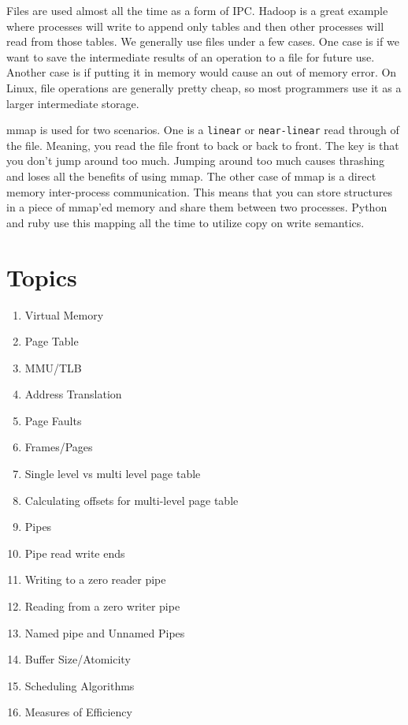 Files are used almost all the time as a form of IPC. Hadoop is a great example where processes will write to append only tables and then other processes will read from those tables. We generally use files under a few cases. One case is if we want to save the intermediate results of an operation to a file for future use. Another case is if putting it in memory would cause an out of memory error. On Linux, file operations are generally pretty cheap, so most programmers use it as a larger intermediate storage.

mmap is used for two scenarios. One is a \texttt{linear} or \texttt{near-linear} read through of the file. Meaning, you read the file front to back or back to front. The key is that you don't jump around too much. Jumping around too much causes thrashing and loses all the benefits of using mmap. The other case of mmap is a direct memory inter-process communication. This means that you can store structures in a piece of mmap'ed memory and share them between two processes. Python and ruby use this mapping all the time to utilize copy on write semantics.

\section{Topics}

\begin{enumerate}
  \item Virtual Memory
  \item Page Table
  \item MMU/TLB
  \item Address Translation
  \item Page Faults
  \item Frames/Pages
  \item Single level vs multi level page table
  \item Calculating offsets for multi-level page table
  \item Pipes
  \item Pipe read write ends
  \item Writing to a zero reader pipe
  \item Reading from a zero writer pipe
  \item Named pipe and Unnamed Pipes
  \item Buffer Size/Atomicity
  \item Scheduling Algorithms
  \item Measures of Efficiency
\end{enumerate}

